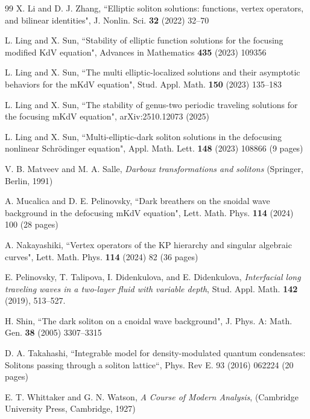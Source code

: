\documentclass[12pt,reqno]{amsart}
\numberwithin{equation}{section}
\begin{document}
\begin{thebibliography}{99}
	 X. Li and D. J. Zhang, ``Elliptic soliton solutions: functions, vertex operators, and bilinear identities",
	J. Nonlin. Sci. {\bf 32} (2022) 32--70	
	
	 L. Ling and X. Sun, ``Stability of elliptic function solutions for the focusing modified KdV equation", Advances in Mathematics {\bf 435} (2023) 109356
	
	 L. Ling and X. Sun, ``The multi elliptic-localized solutions and their asymptotic behaviors for the mKdV equation", Stud. Appl. Math. {\bf 150} (2023) 135--183
	
	 L. Ling and X. Sun, ``The stability of genus-two periodic traveling solutions for the focusing mKdV equation", arXiv:2510.12073 (2025)
	
	 L. Ling and X. Sun, ``Multi-elliptic-dark soliton solutions in the defocusing nonlinear Schr\"{o}dinger equation", Appl. Math. Lett. {\bf 148} (2023) 108866 (9 pages)
	
	 V. B. Matveev and M. A. Salle, {\em Darboux transformations and solitons} (Springer, Berlin, 1991)
		
	 A. Mucalica and D. E. Pelinovsky, ``Dark breathers on the snoidal wave background in the defocusing mKdV equation", Lett. Math. Phys. {\bf 114} (2024) 100 (28 pages)
	
	 A. Nakayashiki, ``Vertex operators of the KP hierarchy and singular algebraic curves", Lett. Math. Phys. {\bf 114} (2024) 82 (36 pages)
	
	  E. Pelinovsky, T. Talipova, I. Didenkulova, and E. Didenkulova, 
	\textit{Interfacial long traveling waves in a two-layer fluid with variable depth}, Stud. Appl. Math. {\bf 142} (2019), 513--527.
	
	 H. Shin, ``The dark soliton on a cnoidal wave background", 
	J. Phys. A: Math. Gen. {\bf 38} (2005) 3307--3315
	
	 D. A. Takahashi, ``Integrable model for density-modulated quantum condensates: Solitons passing through a soliton lattice``, Phys. Rev E. 93 (2016) 062224 (20 pages)
	
	 E. T. Whittaker and G. N. Watson, {\it A Course of Modern Analysis}, (Cambridge University Press, Cambridge, 1927)
	
	
\end{thebibliography}
\end{document}
